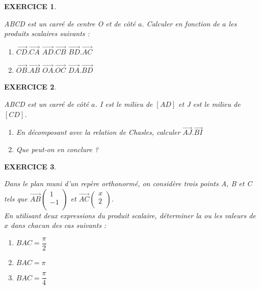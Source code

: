 \documentclass[a4paper]{article}   %
\renewcommand{\(}{\left(}
\renewcommand{\)}{\right)}
\newtheorem{EXO}{\large EXERCICE }
\newenvironment{EX}   { \setcounter{ques}{0} \begin{EXO} \hrulefill ~\vspace{0.3cm}

\normalfont}    {\end{EXO} \medskip}
\newcommand{\f}{\dfrac} 	%
\def\v{\overrightarrow}	%
\begin{document}
\begin{EX} ABCD est un carré de centre O et de côté $a$. Calculer en fonction de $a$ les produits scalaires suivants : 

\begin{enumerate}
\item $\v{CD}.\v{CA}$ \hspace{2cm} $\v{AD}.\v{CB}$ \hspace{2cm} $\v{BD}.\v{AC}$
\item $\v{OB}.\v{AB}$ \hspace{2cm} $\v{OA}.\v{OC}$ \hspace{2cm} $\v{DA}.\v{BD}$
\end{enumerate}

\end{EX}

\begin{EX}
ABCD est un carré de côté $a$. I est le milieu de $[AD]$ et J est le milieu de $[CD]$. 
\begin{enumerate}
\item En décomposant avec la relation de Chasles, calculer $\v{AJ}.\v{BI}$
\item Que peut-on en conclure ?
\end{enumerate}

\end{EX}

\begin{EX}
Dans le plan muni d'un repère orthonormé, on considère trois points A, B et C tels que $\v{AB}\left (\begin{array}{c}
	1 \\
	 -1\\
\end{array} \right) $ et $\v{AC}\left (\begin{array}{c}
	x \\
	 2\\
\end{array} \right)$. \\

En utilisant deux expressions du produit scalaire, déterminer la ou les valeurs de $x$ dans chacun des cas suivants :
\begin{enumerate}
\item $BAC=\f{\pi}{2}$
\item $BAC=\pi$
\item $BAC=\f{\pi}{4}$
\end{enumerate}

\end{EX}
\end{document}
